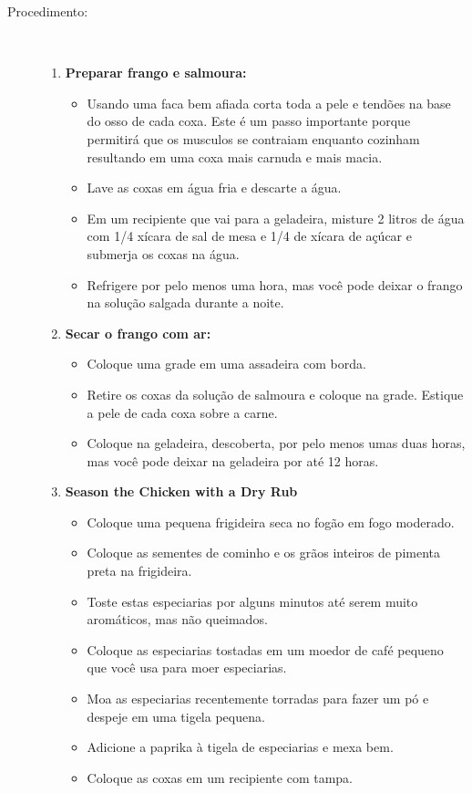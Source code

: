 \documentclass [11pt, letterpaper] {article}
\begin{document}
\begin {description}
\item [Procedimento:] \ \\
\begin {enumerate}
\item {\bf Preparar frango e salmoura:}
\begin {itemize}
\item Usando uma faca bem afiada corta toda a pele e tendões na base do osso de cada coxa. Este é um passo importante porque permitirá que os musculos se contraiam enquanto cozinham resultando em uma coxa mais carnuda e mais macia.
\item Lave as coxas em água fria e descarte a água.
\item Em um recipiente que vai para a geladeira, misture 2 litros de água com 1/4 xícara de sal de mesa e 1/4 de xícara de açúcar e submerja os coxas na água.
\item Refrigere por pelo menos uma hora, mas você pode deixar o frango na solução salgada durante a noite.
\end {itemize}
\item {\bf Secar o frango com ar:}
\begin {itemize}
\item Coloque uma grade em uma assadeira com borda.
\item Retire os coxas da solução de salmoura e coloque na grade. Estique a pele de cada coxa sobre a carne.
\item Coloque na geladeira, descoberta, por pelo menos umas duas horas, mas você pode deixar na geladeira por até 12 horas.
\end {itemize}
\item {\bf Season the Chicken with a Dry Rub}
\begin {itemize}
\item Coloque uma pequena frigideira seca no fogão em fogo moderado.
\item Coloque as sementes de cominho e os grãos inteiros de pimenta preta na frigideira.
\item Toste estas especiarias por alguns minutos até serem muito aromáticos, mas não queimados.
\item Coloque as especiarias tostadas em um moedor de café pequeno que você usa para moer especiarias.
\item Moa as especiarias recentemente torradas para fazer um pó e despeje em uma tigela pequena.
\item Adicione a paprika à tigela de especiarias e mexa bem.
\item Coloque as coxas em um recipiente com tampa.

\end{itemize}
\end{enumerate}
\end{description}
\end{document}
